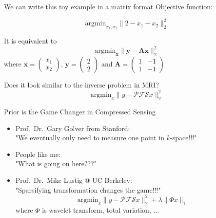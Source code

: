 \begin{frame}{We can write this toy example in a matrix format}
	Objective function:

	\begin{equation}
		\mathrm{argmin}_{x_1, x_2} \lVert 2 - x_1 - x_2 \rVert_2^2
	\end{equation}

	\vspace{1em}

	It is equivalent to
	\begin{equation}
		\mathrm{argmin}_{\mathbf{x}} \lVert \mathbf{y} - \mathbf{A} \mathbf{x} \rVert_2^2
	\end{equation}
	\hspace{1em} where $\mathbf{x} = \begin{pmatrix}
		x_1 \\ x_2
	\end{pmatrix}$, $\mathbf{y} = \begin{pmatrix}
	2 \\ 2
	\end{pmatrix}$ and
	$\mathbf{A} = \begin{pmatrix}
		1 & -1 \\
		1 & -1
	\end{pmatrix}$

	\vspace{3em}
	Does it look similar to the inverse problem in MRI?
	\begin{equation}
		\mathrm{argmin}_x \lVert y -  \mathcal{P} \mathcal{F} \mathcal{S} x \rVert_2^2
	\end{equation}
\end{frame}


\begin{frame}{Prior is the Game Changer in Compressed Sensing}
	\begin{itemize}
		\item <1-> Prof.~Dr.~Gary Golver from Stanford:\\
		"We eventually only need to measure one point in $k$-space!!!"
		\vspace{1em}
		\item <2->People like me:\\
		"What is going on here???"
		\vspace{1em}
		\item <3-> Prof.~Dr.~Mike Lustig @ UC Berkeley:\\
		"Sparsifying transformation changes the game!!!"
		\begin{equation}
			\mathrm{argmin}_x \lVert y -  \mathcal{P} \mathcal{F} \mathcal{S} x \rVert_2^2 + \lambda \lVert \Phi x \rVert_1
		\end{equation}
		where $\Phi$ is wavelet transform, total variation, ...
	\end{itemize}


\end{frame}


